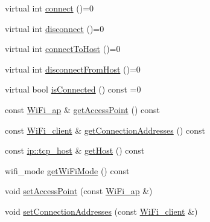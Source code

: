\begin{DoxyCompactItemize}
\item 
virtual int \mbox{\hyperlink{classwood_box_1_1communication_1_1wifi_1_1_a_wi_fi_communicator_a7c4763c1594a4b934e5a39e90b271799}{connect}} ()=0
\item 
virtual int \mbox{\hyperlink{classwood_box_1_1communication_1_1wifi_1_1_a_wi_fi_communicator_ae0be1e1dd1e0508bdd2f348f0052f6e6}{disconnect}} ()=0
\item 
virtual int \mbox{\hyperlink{classwood_box_1_1communication_1_1wifi_1_1_a_wi_fi_communicator_ad8c31be391a58bfabe21c5ef99a94719}{connect\+To\+Host}} ()=0
\item 
virtual int \mbox{\hyperlink{classwood_box_1_1communication_1_1wifi_1_1_a_wi_fi_communicator_aeb87d8a22ad08c929c28191a4c725a5b}{disconnect\+From\+Host}} ()=0
\item 
virtual bool \mbox{\hyperlink{classwood_box_1_1communication_1_1wifi_1_1_a_wi_fi_communicator_aa2a58b4178054b3129d711f62640a6bf}{is\+Connected}} () const =0
\item 
const \mbox{\hyperlink{structwood_box_1_1communication_1_1wifi_1_1s__wifi__access__point}{Wi\+Fi\+\_\+ap}} \& \mbox{\hyperlink{classwood_box_1_1communication_1_1wifi_1_1_a_wi_fi_communicator_abda6749593511b1acc44a999734b9bd6}{get\+Access\+Point}} () const
\item 
const \mbox{\hyperlink{structwood_box_1_1communication_1_1wifi_1_1s__wifi__client}{Wi\+Fi\+\_\+client}} \& \mbox{\hyperlink{classwood_box_1_1communication_1_1wifi_1_1_a_wi_fi_communicator_a9b0669461151786a0c70fbb1c1a07bc7}{get\+Connection\+Addresses}} () const
\item 
const \mbox{\hyperlink{structwood_box_1_1communication_1_1ip_1_1s__host}{ip\+::tcp\+\_\+host}} \& \mbox{\hyperlink{classwood_box_1_1communication_1_1wifi_1_1_a_wi_fi_communicator_a6bd3193f145df44c577da0f0e7a8686a}{get\+Host}} () const
\item 
wifi\+\_\+mode \mbox{\hyperlink{classwood_box_1_1communication_1_1wifi_1_1_a_wi_fi_communicator_aa5b3e64e11585cb4ac16e7bd39fe565b}{get\+Wi\+Fi\+Mode}} () const
\item 
void \mbox{\hyperlink{classwood_box_1_1communication_1_1wifi_1_1_a_wi_fi_communicator_a6987322a622fab72d4a01de99da19491}{set\+Access\+Point}} (const \mbox{\hyperlink{structwood_box_1_1communication_1_1wifi_1_1s__wifi__access__point}{Wi\+Fi\+\_\+ap}} \&)
\item 
void \mbox{\hyperlink{classwood_box_1_1communication_1_1wifi_1_1_a_wi_fi_communicator_ae0e96daf4cbeef3e646cc5af87eaa82d}{set\+Connection\+Addresses}} (const \mbox{\hyperlink{structwood_box_1_1communication_1_1wifi_1_1s__wifi__client}{Wi\+Fi\+\_\+client}} \&)

\end{DoxyCompactItemize}
